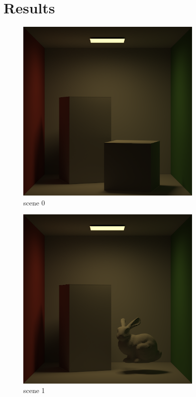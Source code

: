 \documentclass[acmtog]{acmart}
\begin{document}
	\section{Results}
	\begin{figure}[h]
		\centering
		\includegraphics[height =9cm]{output_0_4096.png}
		\caption{scene 0}
	\end{figure}

	\begin{figure}[h]
		\centering
		\includegraphics[height = 9cm]{output_1_4096.png}
		\caption{scene 1}
	\end{figure}
\end{document}
